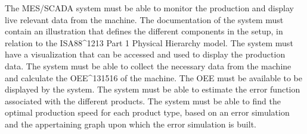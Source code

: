 The MES/SCADA system must be able to monitor the production and display live relevant data from the machine.
The documentation of the system must contain an illustration that defines the different components in the setup, in relation to the ISA88\^{}1213 Part 1 Physical Hierarchy model.
The system must have a visualization that can be accessed and used to display the production data.
The system must be able to collect the necessary data from the machine and calculate the OEE\^{}131516 of the machine. The OEE must be available to be displayed by the system.
The system must be able to estimate the error function associated with the different products.
The system must be able to find the optimal production speed for each product type, based on an error simulation and the appertaining graph upon which the error simulation is built.

